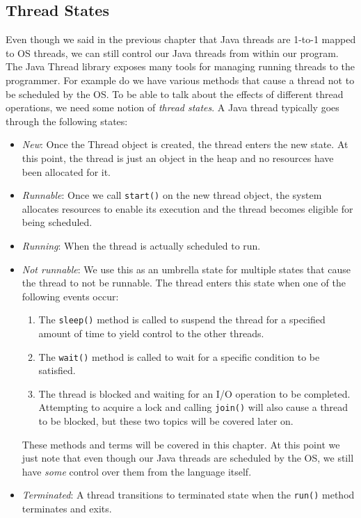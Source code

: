 \documentclass[main.tex]{subfiles}
\begin{document}
\subsection{Thread States}
Even though we said in the previous chapter that Java threads are 1-to-1 mapped to OS threads, we can still control our Java threads from within our program. The Java Thread library exposes many tools for managing running threads to the programmer. For example do we have various methods that cause a thread not to be scheduled by the OS. To be able to talk about the effects of different thread operations, we need some notion of \textit{thread states}. A Java thread typically goes through the following states:
\begin{itemize}
    \item \textit{New}: Once the Thread object is created, the thread enters the new state. At this point, the thread is just an object in the heap and no resources have been allocated for it.
    \item \textit{Runnable}: Once we call \texttt{start()} on the new thread object, the system allocates resources to enable its execution and the thread becomes eligible for being scheduled.
    \item \textit{Running}: When the thread is actually scheduled to run.
    \item \textit{Not runnable}: We use this as an umbrella state for multiple states that cause the thread to not be runnable. The thread enters this state when one of the following events occur:
          \begin{enumerate}
              \item The \texttt{sleep()} method is called to suspend the thread for a specified amount of time to yield control to the other threads.
              \item The \texttt{wait()} method is called to wait for a specific condition to be satisfied.
              \item The thread is blocked and waiting for an I/O operation to be completed. Attempting to acquire a lock and calling \texttt{join()} will also cause a thread to be blocked, but these two topics will be covered later on.
          \end{enumerate}
          These methods and terms will be covered in this chapter. At this point we just note that even though our Java threads are scheduled by the OS, we still have \textit{some} control over them from the language itself.
    \item \textit{Terminated}: A thread transitions to terminated state when the \texttt{run()} method terminates and exits.
\end{itemize}
\end{document}
